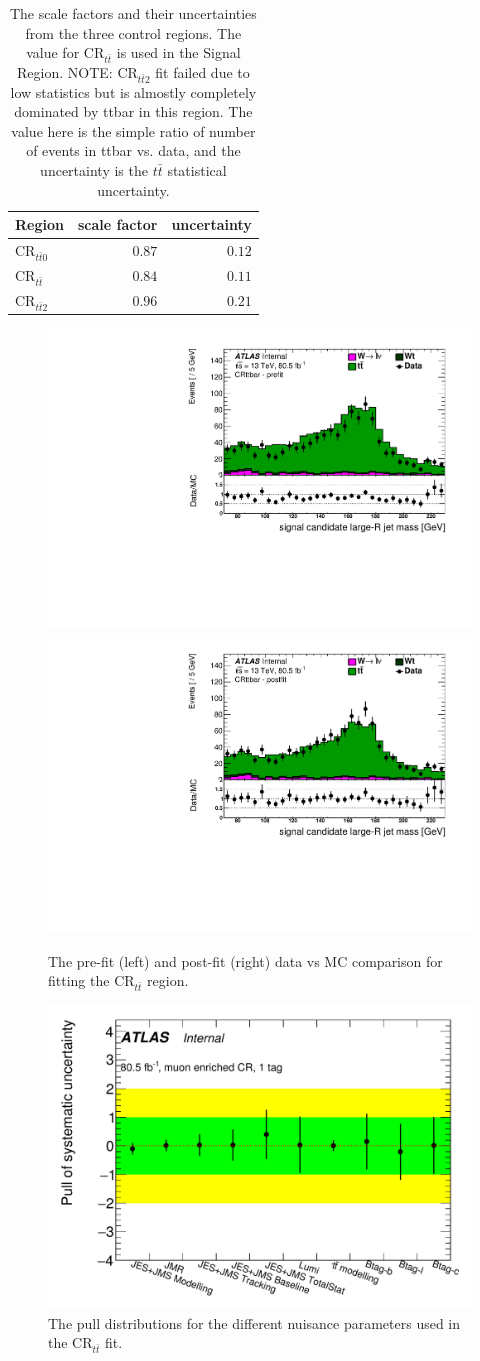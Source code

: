 \begin{table}
  \centering
  \caption{The \ttbar scale factors and their uncertainties from the three \ttbar
control regions. The value for $\text{CR}_{t\bar{t}}$ is used in the Signal Region. NOTE:
$\text{CR}_{t\bar{t}2}$ fit failed due to low statistics but is almostly completely dominated
by ttbar in this region.  The value here is the simple ratio of number of events in ttbar
vs. data, and the uncertainty is the $t\bar{t}$ statistical uncertainty.}
  \begin{tabular}{@{}lrr@{}}
    \toprule
    Region & scale factor & uncertainty \\
    \midrule
    $\text{CR}_{t\bar{t}0}$ & $0.87$ & $0.12$ \\
    $\text{CR}_{t\bar{t}}$  & $0.84$ & $0.11$ \\
    $\text{CR}_{t\bar{t}2}$ & $0.96$ & $0.21$ \\
    \bottomrule
  \end{tabular}
  \label{table:ttbar_kfactors}
\end{table}

\begin{figure}[!htbp]
\centering
\includegraphics[width=0.49\linewidth]{figures/backgrounds/ttbar_prefit} \hfill
\includegraphics[width=0.49\linewidth]{figures/backgrounds/ttbar_postfit}
\caption{The pre-fit (left) and post-fit (right) data vs MC comparison for fitting the $\text{CR}_{t\bar{t}}$ region.}
\label{sec:background:ttbar_fit}
\end{figure}

\begin{figure}[!htbp]
\centering
\includegraphics[width=0.7\linewidth]{figures/backgrounds/ttbar_pulls}
\caption{The pull distributions for the different nuisance parameters used in the $\text{CR}_{t\bar{t}}$ fit.}
\label{sec:background:ttbar_pulls}
\end{figure}
